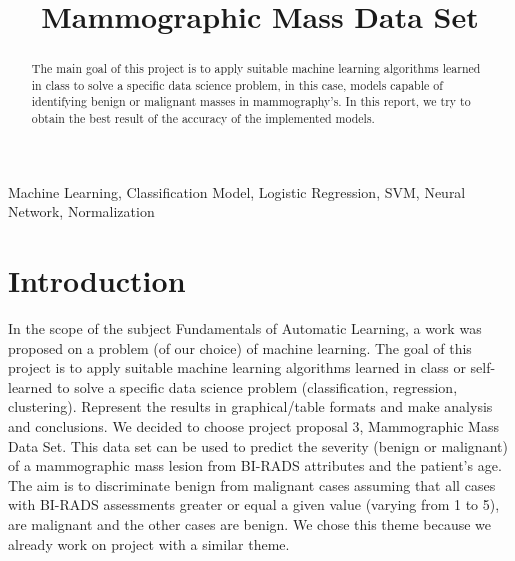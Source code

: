 \documentclass[conference]{IEEEtran}
\begin{document}
\title{Mammographic Mass Data Set}

\author{
}
\maketitle

\maketitle

\begin{abstract}
The main goal of this project is to apply suitable machine learning algorithms learned in class to solve a specific data science problem, in this case, models capable of identifying benign or malignant masses in mammography's. In this report, we try to obtain the best result of the accuracy of the implemented models.
\end{abstract}

\begin{IEEEkeywords}
Machine Learning, Classification Model, Logistic Regression, SVM, Neural Network, Normalization
\end{IEEEkeywords}

\IEEEpeerreviewmaketitle

\section{Introduction}
In the scope of the subject Fundamentals of Automatic Learning, a work was proposed on a problem (of our choice) of machine learning. The goal of this project is to apply suitable machine learning algorithms learned in class or self-learned to solve a specific data science problem (classification, regression, clustering). Represent the results in graphical/table formats and make analysis and conclusions.
We decided to choose project proposal 3, Mammographic Mass Data Set. This data set can be used to predict the severity (benign or malignant) of a mammographic mass lesion from BI-RADS attributes and the patient's age. The aim is to discriminate benign from malignant cases assuming that all cases with BI-RADS assessments greater or equal a given value (varying from 1 to 5), are malignant and the other cases are benign. We chose this theme because we already work on project with a similar theme.
\end{document}

